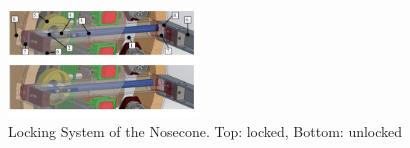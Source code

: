   \begin{figure}[h!]
 	\centering
        \includegraphics[width=0.45\textwidth]{img/AV_FIG_CAD_lockingsystem_22.jpg}
        \caption{Locking System of the Nosecone. Top: locked, Bottom: unlocked}
        \label{f:av_locking_sys}
 \end{figure}

